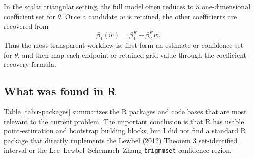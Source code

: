 \documentclass[11pt]{article}
\theoremstyle{plain}
\theoremstyle{definition}
\theoremstyle{remark}
\begin{document}
In the scalar triangular setting, the full model often reduces to a one-dimensional
coefficient set for $\theta$.  Once a candidate $w$ is retained, the other
coefficients are recovered from
\begin{equation}
\beta_1(w)=\beta_1^R-\beta_2^R w.
\end{equation}
Thus the most transparent workflow is: first form an estimate or confidence set
for $\theta$, and then map each endpoint or retained grid value through the
coefficient recovery formula.

\subsection{What was found in R}
\label{subsec:r-packages-found}

Table \ref{tab:r-packages} summarizes the R packages and code bases that are
most relevant to the current problem.  The important conclusion is that R has
usable point-estimation and bootstrap building blocks, but I did not find a
standard R package that directly implements the Lewbel (2012) Theorem 3
set-identified interval or the Lee--Lewbel--Schennach--Zhang \texttt{trigmmset}
confidence region.
\end{document}
